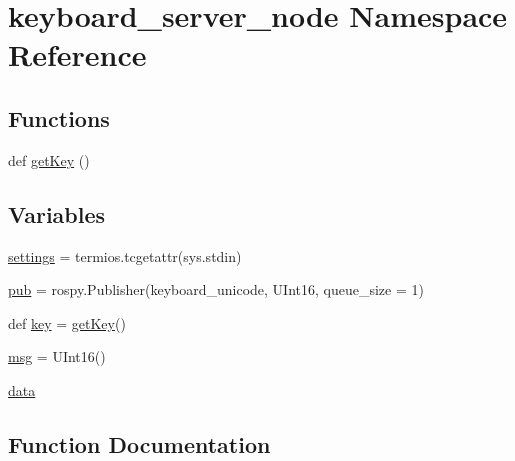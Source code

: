 \hypertarget{namespacekeyboard__server__node}{}\section{keyboard\+\_\+server\+\_\+node Namespace Reference}
\label{namespacekeyboard__server__node}
\subsection*{Functions}
\begin{DoxyCompactItemize}
\item 
def \hyperlink{namespacekeyboard__server__node_abe4dc127c8bdf79333dfa931e556f6f7}{get\+Key} ()
\end{DoxyCompactItemize}
\subsection*{Variables}
\begin{DoxyCompactItemize}
\item 
\hyperlink{namespacekeyboard__server__node_ade1a45e58d917f8cdb07d1d54ac6bd34}{settings} = termios.\+tcgetattr(sys.\+stdin)
\item 
\hyperlink{namespacekeyboard__server__node_acb9a153a1e2ddb5dab254f49ade8512e}{pub} = rospy.\+Publisher(\textquotesingle{}keyboard\+\_\+unicode\textquotesingle{}, U\+Int16, queue\+\_\+size = 1)
\item 
def \hyperlink{namespacekeyboard__server__node_af0ebd8a9e1564ddc13a227c727602466}{key} = \hyperlink{namespacekeyboard__server__node_abe4dc127c8bdf79333dfa931e556f6f7}{get\+Key}()
\item 
\hyperlink{namespacekeyboard__server__node_a555024e72f3e57503b0eebad2546fc72}{msg} = U\+Int16()
\item 
\hyperlink{namespacekeyboard__server__node_abfec01745fb17e2aa813913bea03d707}{data}
\end{DoxyCompactItemize}


\subsection{Function Documentation}
\mbox{\label{namespacekeyboard__server__node_abe4dc127c8bdf79333dfa931e556f6f7}} 
